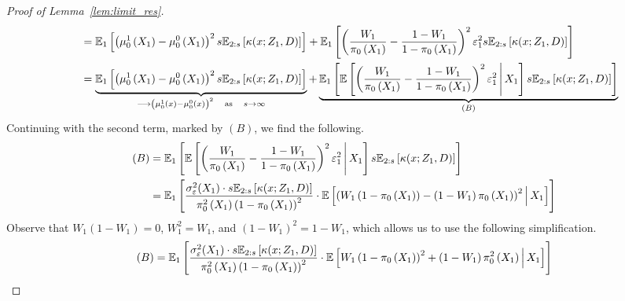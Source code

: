 \begin{proof}[Proof of Lemma~\ref{lem:limit_res}]
\begin{equation}
\begin{aligned}
			 & \quad =  \mathbb{E}_{1}\left[\left(\mu_{0}^{1}\left(X_{1}\right) - \mu_{0}^{0}\left(X_{1}\right)\right)^2 s \mathbb{E}_{2:s}\left[\kappa(x; Z_1, D)\right]\right]
			+ \mathbb{E}_{1}\left[\left(\frac{W_{1}}{\pi_{0}\left(X_1\right)} - \frac{1 - W_{1}}{1 - \pi_{0}\left(X_1\right)}\right)^2 \varepsilon_{1}^2 s \mathbb{E}_{2:s}\left[\kappa(x; Z_1, D)\right]\right]                                                                                               \\
			 & \quad = \underbrace{\mathbb{E}_{1}\left[\left(\mu_{0}^{1}\left(X_{1}\right) - \mu_{0}^{0}\left(X_{1}\right)\right)^2 s \mathbb{E}_{2:s}\left[\kappa(x; Z_1, D)\right]\right]}_{\longrightarrow \left(\mu_{0}^{1}\left(x\right) - \mu_{0}^{0}\left(x\right)\right)^2 \quad \text{as} \quad s \rightarrow \infty}
			+ \underbrace{\mathbb{E}_{1}\left[\mathbb{E}\left[\left(\frac{W_{1}}{\pi_{0}\left(X_1\right)} - \frac{1 - W_{1}}{1 - \pi_{0}\left(X_1\right)}\right)^2 \varepsilon_{1}^2 \, \middle| \, X_1\right] s \mathbb{E}_{2:s}\left[\kappa(x; Z_1, D)\right]\right]}_{(B)}
		\end{aligned}
	\end{equation}
	Continuing with the second term, marked by $(B)$, we find the following.
	\begin{equation}
		\begin{aligned}
			(B)
			 & = \mathbb{E}_{1}\left[\mathbb{E}\left[\left(\frac{W_{1}}{\pi_{0}\left(X_1\right)} - \frac{1 - W_{1}}{1 - \pi_{0}\left(X_1\right)}\right)^2 \varepsilon_{1}^2 \, \middle| \, X_1\right] s \mathbb{E}_{2:s}\left[\kappa(x; Z_1, D)\right]\right] \\
			 & = \mathbb{E}_{1}\left[\frac{\sigma_{\varepsilon}^2(X_1) \cdot s \mathbb{E}_{2:s}\left[\kappa(x; Z_1, D)\right]}{\pi_{0}^2\left(X_1\right)\left(1 - \pi_{0}\left(X_1\right)\right)^2} \cdot
			\mathbb{E}\left[\left(W_{1}\left(1 - \pi_{0}\left(X_1\right)\right) - \left(1 - W_{1}\right)\pi_{0}\left(X_1\right)\right)^2 \, \middle| \, X_1\right] \right]                                                                    \\
		\end{aligned}
	\end{equation}
	Observe that $W_1(1-W_1) = 0$, $W_1^2 = W_1$, and $(1-W_1)^2 = 1 - W_1$, which allows us to use the following simplification.
	\begin{equation}
		\begin{aligned}
			(B)
			 & = \E_{1}\left[\frac{\sigma_{\varepsilon}^2(X_1) \cdot s \E_{2:s}\left[\kappa(x; Z_1, D)\right]}{\pi_{0}^2\left(X_1\right)\left(1 - \pi_{0}\left(X_1\right)\right)^2} \cdot
			\E\left[W_{1}\left(1 - \pi_{0}\left(X_1\right)\right)^2 + \left(1 - W_{1}\right)\pi_{0}^2\left(X_1\right) \, \middle| \, X_1\right] \right]                                   \\

\end{aligned}
\end{equation}
\end{proof}
